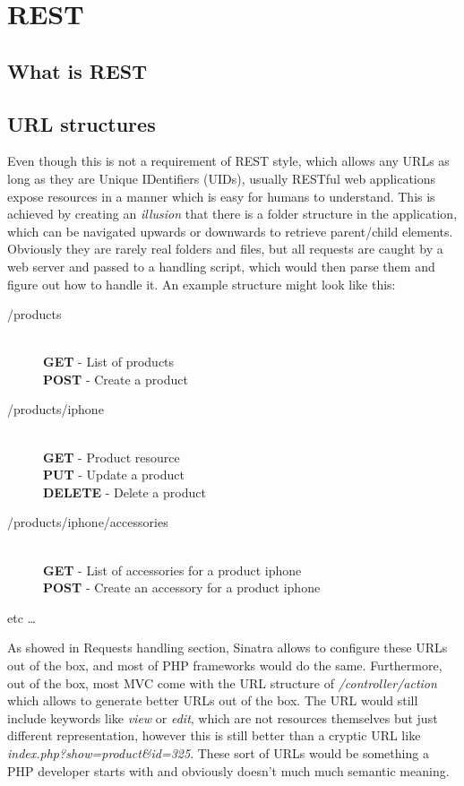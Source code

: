 \chapter{REST}

\section{What is REST}

\section{URL structures}

Even though this is not a requirement of REST style, which allows any URLs as long as they are Unique IDentifiers (UIDs), usually RESTful web applications expose resources in a manner which is easy for humans to understand. This is achieved by creating an \textit{illusion} that there is a folder structure in the application, which can be navigated upwards or downwards to retrieve parent/child elements. Obviously they are rarely real folders and files, but all requests are caught by a web server and passed to a handling script, which would then parse them and figure out how to handle it. An example structure might look like this:

\begin{description}
  \item[/products] \hfill \\
  \textbf{GET}     - List of products \\
  \textbf{POST}    - Create a product
  \item[/products/iphone] \hfill \\
  \textbf{GET}     - Product resource \\
  \textbf{PUT}     - Update a product \\
  \textbf{DELETE}  - Delete a product
  \item[/products/iphone/accessories] \hfill \\
  \textbf{GET}     - List of accessories for a product iphone \\
  \textbf{POST}    - Create an accessory for a product iphone
  \item[etc \ldots]
\end{description}

As showed in Requests handling section, Sinatra allows to configure these URLs out of the box, and most of PHP frameworks would do the same. Furthermore, out of the box, most MVC come with the URL structure of \textit{/controller/action} which allows to generate better URLs out of the box. The URL would still include keywords like \textit{view} or \textit{edit}, which are not resources themselves but just different representation, however this is still better than a cryptic URL like \textit{index.php?show=product\&id=325}. These sort of URLs would be something a PHP developer starts with and obviously doesn't much much semantic meaning.

